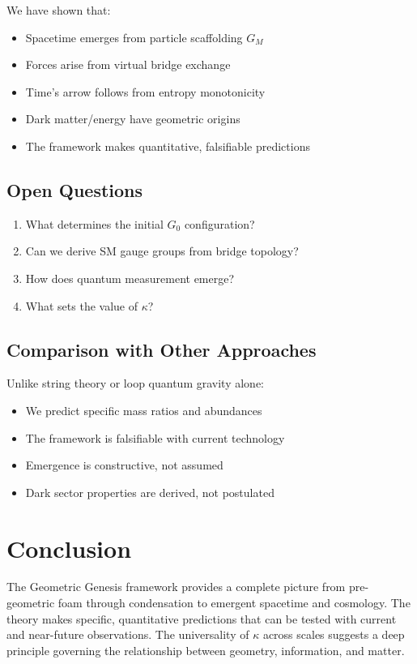 \documentclass[11pt]{article}
\theoremstyle{plain}
\theoremstyle{definition}
\begin{document}
We have shown that:
\begin{itemize}
  \item Spacetime emerges from particle scaffolding $G_M$
  \item Forces arise from virtual bridge exchange
  \item Time's arrow follows from entropy monotonicity
  \item Dark matter/energy have geometric origins
  \item The framework makes quantitative, falsifiable predictions
\end{itemize}

\subsection{Open Questions}

\begin{enumerate}
  \item What determines the initial $G_0$ configuration?
  \item Can we derive SM gauge groups from bridge topology?
  \item How does quantum measurement emerge?
  \item What sets the value of $\kappa$?
\end{enumerate}

\subsection{Comparison with Other Approaches}

Unlike string theory or loop quantum gravity alone:
\begin{itemize}
  \item We predict specific mass ratios and abundances
  \item The framework is falsifiable with current technology
  \item Emergence is constructive, not assumed
  \item Dark sector properties are derived, not postulated
\end{itemize}

\section{Conclusion}

The Geometric Genesis framework provides a complete picture from pre-geometric foam through condensation to emergent spacetime and cosmology. The theory makes specific, quantitative predictions that can be tested with current and near-future observations. The universality of $\kappa$ across scales suggests a deep principle governing the relationship between geometry, information, and matter.
\end{document}
